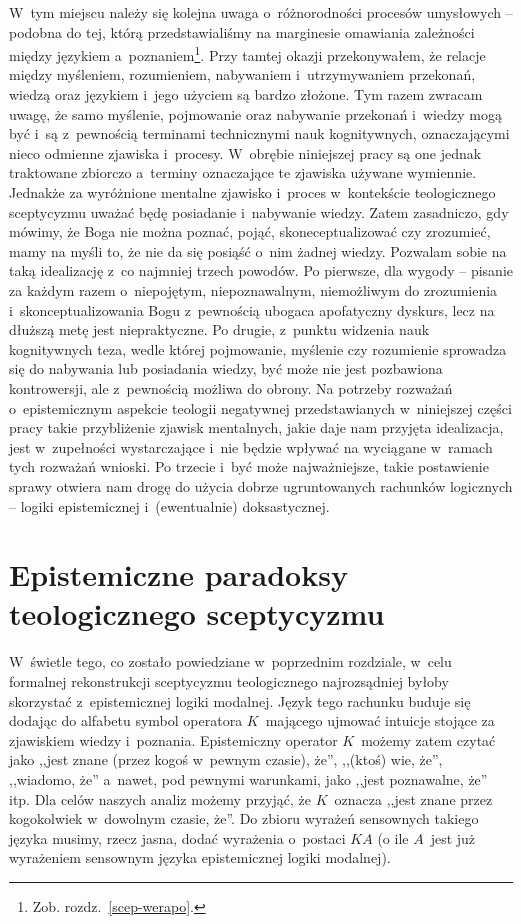 W~tym miejscu należy się kolejna uwaga o~różnorodności procesów umysłowych -- podobna do tej, którą przedstawialiśmy na marginesie omawiania zależności między językiem a~poznaniem\footnote{Zob. rozdz.~\ref{scep-werapo}.}. Przy tamtej okazji przekonywałem, że relacje między myśleniem, rozumieniem, nabywaniem i~utrzymywaniem przekonań, wiedzą oraz językiem i~jego użyciem są bardzo złożone. Tym razem zwracam uwagę, że samo myślenie, pojmowanie oraz nabywanie przekonań i~wiedzy mogą być i~są z~pewnością terminami technicznymi nauk kognitywnych, oznaczającymi nieco odmienne zjawiska i~procesy. W~obrębie niniejszej pracy są one jednak traktowane zbiorczo a~terminy oznaczające te zjawiska używane wymiennie. Jednakże za wyróżnione mentalne zjawisko i~proces w~kontekście teologicznego sceptycyzmu uważać będę posiadanie i~nabywanie wiedzy. Zatem zasadniczo, gdy mówimy, że Boga nie można poznać, pojąć, skoneceptualizować czy zrozumieć, mamy na myśli to, że nie da się posiąść o~nim żadnej wiedzy. Pozwalam sobie na taką idealizację z~co najmniej trzech powodów.
Po pierwsze, dla wygody -- pisanie za każdym razem o~niepojętym, niepoznawalnym, niemożliwym do zrozumienia i~skonceptualizowania Bogu z~pewnością ubogaca apofatyczny dyskurs, lecz na dłuższą metę jest niepraktyczne. Po drugie, z~punktu widzenia nauk kognitywnych teza, wedle której pojmowanie, myślenie czy rozumienie sprowadza się do nabywania lub posiadania wiedzy, być może nie jest pozbawiona kontrowersji, ale z~pewnością możliwa do obrony. Na potrzeby rozważań o~epistemicznym aspekcie teologii negatywnej przedstawianych w~niniejszej części pracy takie przybliżenie zjawisk mentalnych, jakie daje nam przyjęta idealizacja, jest w~zupełności wystarczające i~nie będzie wpływać na wyciągane w~ramach tych rozważań wnioski. Po trzecie i~być może najważniejsze, takie postawienie sprawy otwiera nam drogę do użycia dobrze ugruntowanych rachunków logicznych -- logiki epistemicznej i~(ewentualnie) doksastycznej.





\chapter{Epistemiczne paradoksy teologicznego sceptycyzmu}\label{scep-par}

W~świetle tego, co zostało powiedziane w~poprzednim rozdziale, w~celu formalnej rekonstrukcji sceptycyzmu teologicznego najrozsądniej byłoby skorzystać z~epistemicznej logiki modalnej. Język tego rachunku buduje się dodając do alfabetu symbol operatora $K$~mającego ujmować intuicje stojące za zjawiskiem wiedzy i~poznania. Epistemiczny operator $K$~możemy zatem czytać jako ,,jest znane (przez kogoś w~pewnym czasie), że'', ,,(ktoś) wie, że'', ,,wiadomo, że'' a~nawet, pod pewnymi warunkami, jako ,,jest poznawalne, że'' itp. Dla celów naszych analiz możemy przyjąć, że $K$~oznacza ,,jest znane przez kogokolwiek w~dowolnym czasie, że''. Do zbioru wyrażeń sensownych takiego języka musimy, rzecz jasna, dodać wyrażenia o~postaci $KA$ (o ile $A$~jest już wyrażeniem sensownym języka epistemicznej logiki modalnej).

